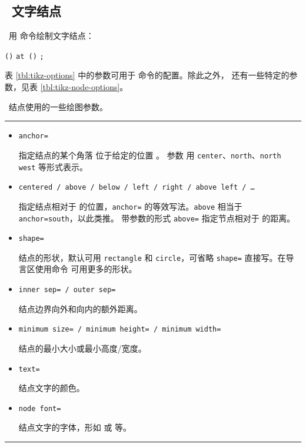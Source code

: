 \subsection{\TikZ\ 文字结点}\label{subsec:tikz-node}

\TikZ\ 用  命令绘制文字结点：
\begin{command}
 \texttt{()} \texttt{at ()} \texttt{;}
\end{command}
\begin{example}
\end{example}

表 \ref{tbl:tikz-options} 中的参数可用于  命令的配置。除此之外， 还有一些特定的参数，见表 \ref{tbl:tikz-node-options}。

\begin{table}[htp]
\caption{\TikZ\ 结点使用的一些绘图参数。}\label{tbl:tikz-node-options}
\small
\hrule
\begin{itemize}
  \item \texttt{anchor=} \par
  指定结点的某个角落  位于给定的位置 。
  参数  用 \texttt{center}、\texttt{north}、\texttt{north west} 等形式表示。
  \item \texttt{centered / above / below / left / right / above left / \ldots} \par
  指定结点相对于  的位置，\texttt{anchor=} 的等效写法。\texttt{above} 相当于 \texttt{anchor=south}，以此类推。
  带参数的形式 \texttt{above=} 指定节点相对于  的距离。
  \item \texttt{shape=} \par
  结点的形状，默认可用 \texttt{rectangle} 和 \texttt{circle}，可省略 \texttt{shape=} 直接写。在导言区使用命令 
   可用更多的形状。
  \item \texttt{inner sep= / outer sep=} \par
  结点边界向外和向内的额外距离。
  \item \texttt{minimum size= / minimum height= / minimum width=} \par
  结点的最小大小或最小高度/宽度。
  \item \texttt{text=} \par
  结点文字的颜色。
  \item \texttt{node font=} \par
  结点文字的字体，形如  或  等。
\end{itemize}
\hrule
\end{table}

